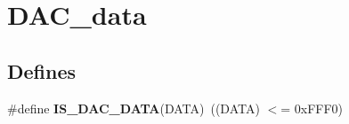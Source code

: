 \hypertarget{group__DAC__data}{
\section{DAC\_\-data}
\label{group__DAC__data}
}
\subsection*{Defines}
\begin{DoxyCompactItemize}
\item 
\hypertarget{group__DAC__data_ga903e28d4971e172b37c1c2fc17c2a884}{
\#define {\bfseries IS\_\-DAC\_\-DATA}(DATA)~((DATA) $<$= 0xFFF0)}
\label{group__DAC__data_ga903e28d4971e172b37c1c2fc17c2a884}

\end{DoxyCompactItemize}
